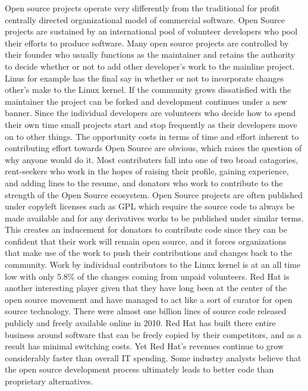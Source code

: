 Open source projects operate very differently from the traditional for profit centrally directed organizational model of commercial software. Open Source projects are sustained by an international pool of volunteer developers who pool their efforts to produce software.\autocite[191]{buxmann2012software}
Many open source projects are controlled by their founder who usually functions as the maintainer and retains the authority to decide whether or not to add other developer's work to the mainline project. Linus for example has the final say in whether or not to incorporate changes other's make to the Linux kernel. If the community grows dissatisfied with the maintainer the project can be forked and development continues under a new banner. Since the individual developers are volunteers who decide how to spend their own time small projects start and stop frequently as their developers move on to other things.\autocite[197]{buxmann2012software}
The opportunity costs in terms of time and effort inherent to contributing effort towards Open Source are obvious, which raises the question of why anyone would do it. Most contributers fall into one of two broad catagories, rent-seekers who work in the hopes of raising their profile, gaining experience, and adding lines to the resume, and donators who work to contribute to the strength of the Open Source ecosystem.\autocite[198]{buxmann2012software}
Open Source projects are often published under copyleft licenses such as GPL which require the source code to always be made available and for any derivatives works to be published under similar terms. This creates an inducement for donators to contribute code since they can be confident that their work will remain open source, and it forces organizations that make use of the work to push their contributions and changes back to the community.\autocite[198]{buxmann2012software}
Work by individual contributors to the Linux kernel is at an all time low with only 5.8\% of the changes coming from unpaid volunteers.\autocite[]{KernelDevelopment2015}
Red Hat is another interesting player given that they have long been at the center of the open source movement and have managed to act like a sort of curator for open source technology.\autocite[]{OptimismInnovation}
There were almost one billion lines of source code released publicly and freely available online in 2010.\autocite[]{OptimismInnovation}
Red Hat has built there entire business around software that can be freely copied by their competitors, and as a result has minimal switching costs. Yet Red Hat's revenues continue to grow considerably faster than overall IT spending.\autocite[]{OptimismInnovation}
Some industry analysts believe that the open source development process ultimately leads to better code than proprietary alternatives.\autocite[]{OptimismInnovation}


